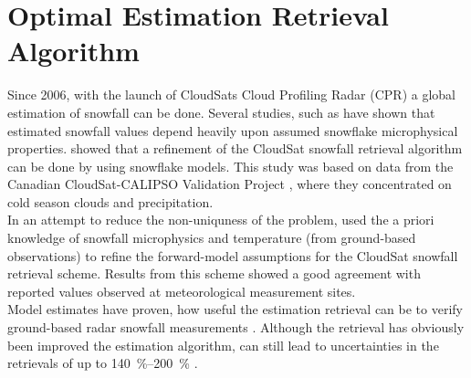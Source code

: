 \chapter{Optimal Estimation Retrieval Algorithm} %
\label{ch:retrieval}
Since 2006, with the launch of CloudSats Cloud Profiling Radar (CPR) a global estimation of snowfall can be done. Several studies, such as \cite{kulie_utilizing_2009} have shown that estimated snowfall values depend heavily upon assumed snowflake microphysical properties.
\cite{wood_microphysical_2015} showed that a refinement of the CloudSat snowfall retrieval algorithm can be done by using snowflake models. 
This study was based on data from the Canadian CloudSat-CALIPSO Validation Project \citep[C3VP,][]{hudak_canadian_2006}, where they concentrated on cold season clouds and precipitation.
\\
\noindent In an attempt to reduce the non-uniquness of the problem, \cite{wood_microphysical_2015} used the a priori knowledge of snowfall microphysics and temperature (from ground-based observations) to refine the forward-model assumptions for the CloudSat snowfall retrieval scheme. 
Results from this scheme showed a good agreement with reported values observed at meteorological measurement sites. \\
Model estimates have proven, how useful the estimation retrieval can be to verify ground-based radar snowfall measurements \citep{norin_intercomparison_2015}.
Although the retrieval has obviously been improved the estimation algorithm, can still lead to uncertainties in the retrievals of up to \SIrange{140}{200}{\percent} \citep{wood_estimation_2011}. 
\\
